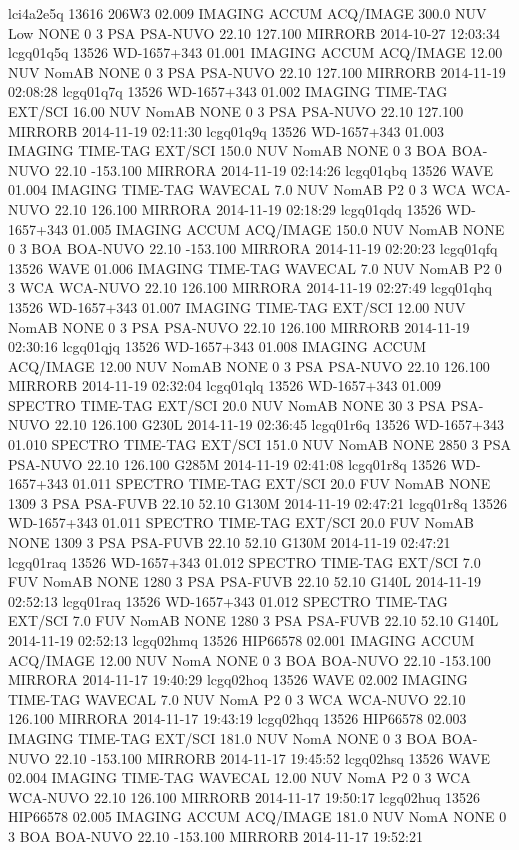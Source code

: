 lci4a2e5q 13616 206W3 02.009 IMAGING ACCUM ACQ/IMAGE 300.0 NUV Low NONE 0 3 PSA PSA-NUVO 22.10 127.100 MIRRORB 2014-10-27 12:03:34
lcgq01q5q 13526 WD-1657+343 01.001 IMAGING ACCUM ACQ/IMAGE 12.00 NUV NomAB NONE 0 3 PSA PSA-NUVO 22.10 127.100 MIRRORB 2014-11-19 02:08:28
lcgq01q7q 13526 WD-1657+343 01.002 IMAGING TIME-TAG EXT/SCI 16.00 NUV NomAB NONE 0 3 PSA PSA-NUVO 22.10 127.100 MIRRORB 2014-11-19 02:11:30
lcgq01q9q 13526 WD-1657+343 01.003 IMAGING TIME-TAG EXT/SCI 150.0 NUV NomAB NONE 0 3 BOA BOA-NUVO 22.10 -153.100 MIRRORA 2014-11-19 02:14:26
lcgq01qbq 13526 WAVE 01.004 IMAGING TIME-TAG WAVECAL 7.0 NUV NomAB P2 0 3 WCA WCA-NUVO 22.10 126.100 MIRRORA 2014-11-19 02:18:29
lcgq01qdq 13526 WD-1657+343 01.005 IMAGING ACCUM ACQ/IMAGE 150.0 NUV NomAB NONE 0 3 BOA BOA-NUVO 22.10 -153.100 MIRRORA 2014-11-19 02:20:23
lcgq01qfq 13526 WAVE 01.006 IMAGING TIME-TAG WAVECAL 7.0 NUV NomAB P2 0 3 WCA WCA-NUVO 22.10 126.100 MIRRORA 2014-11-19 02:27:49
lcgq01qhq 13526 WD-1657+343 01.007 IMAGING TIME-TAG EXT/SCI 12.00 NUV NomAB NONE 0 3 PSA PSA-NUVO 22.10 126.100 MIRRORB 2014-11-19 02:30:16
lcgq01qjq 13526 WD-1657+343 01.008 IMAGING ACCUM ACQ/IMAGE 12.00 NUV NomAB NONE 0 3 PSA PSA-NUVO 22.10 126.100 MIRRORB 2014-11-19 02:32:04
lcgq01qlq 13526 WD-1657+343 01.009 SPECTRO TIME-TAG EXT/SCI 20.0 NUV NomAB NONE 30 3 PSA PSA-NUVO 22.10 126.100 G230L 2014-11-19 02:36:45
lcgq01r6q 13526 WD-1657+343 01.010 SPECTRO TIME-TAG EXT/SCI 151.0 NUV NomAB NONE 2850 3 PSA PSA-NUVO 22.10 126.100 G285M 2014-11-19 02:41:08
lcgq01r8q 13526 WD-1657+343 01.011 SPECTRO TIME-TAG EXT/SCI 20.0 FUV NomAB NONE 1309 3 PSA PSA-FUVB 22.10 52.10 G130M 2014-11-19 02:47:21
lcgq01r8q 13526 WD-1657+343 01.011 SPECTRO TIME-TAG EXT/SCI 20.0 FUV NomAB NONE 1309 3 PSA PSA-FUVB 22.10 52.10 G130M 2014-11-19 02:47:21
lcgq01raq 13526 WD-1657+343 01.012 SPECTRO TIME-TAG EXT/SCI 7.0 FUV NomAB NONE 1280 3 PSA PSA-FUVB 22.10 52.10 G140L 2014-11-19 02:52:13
lcgq01raq 13526 WD-1657+343 01.012 SPECTRO TIME-TAG EXT/SCI 7.0 FUV NomAB NONE 1280 3 PSA PSA-FUVB 22.10 52.10 G140L 2014-11-19 02:52:13
lcgq02hmq 13526 HIP66578 02.001 IMAGING ACCUM ACQ/IMAGE 12.00 NUV NomA NONE 0 3 BOA BOA-NUVO 22.10 -153.100 MIRRORA 2014-11-17 19:40:29
lcgq02hoq 13526 WAVE 02.002 IMAGING TIME-TAG WAVECAL 7.0 NUV NomA P2 0 3 WCA WCA-NUVO 22.10 126.100 MIRRORA 2014-11-17 19:43:19
lcgq02hqq 13526 HIP66578 02.003 IMAGING TIME-TAG EXT/SCI 181.0 NUV NomA NONE 0 3 BOA BOA-NUVO 22.10 -153.100 MIRRORB 2014-11-17 19:45:52
lcgq02hsq 13526 WAVE 02.004 IMAGING TIME-TAG WAVECAL 12.00 NUV NomA P2 0 3 WCA WCA-NUVO 22.10 126.100 MIRRORB 2014-11-17 19:50:17
lcgq02huq 13526 HIP66578 02.005 IMAGING ACCUM ACQ/IMAGE 181.0 NUV NomA NONE 0 3 BOA BOA-NUVO 22.10 -153.100 MIRRORB 2014-11-17 19:52:21
